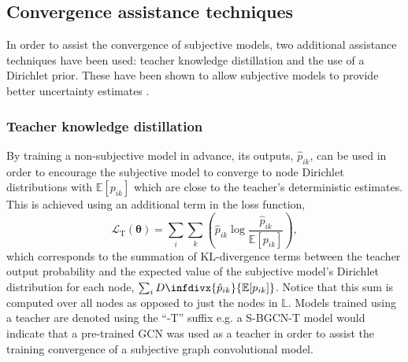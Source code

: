\documentclass[
twocolumn,
]{ceurart}
\newcommand{\infdiv}{D\infdivx}
\begin{document}
\subsection{Convergence assistance techniques}
In order to assist the convergence of subjective models, two additional assistance techniques have been used: teacher knowledge distillation and the use of a Dirichlet prior.
These have been shown to allow subjective models to provide better uncertainty estimates \cite{ZhaoXujiang2020}.
\subsubsection{Teacher knowledge distillation}
By training a non-subjective model in advance, its outputs, $\hat{p}_{ik}$, can be used in order to encourage the subjective model to converge to node Dirichlet distributions with $\mathbb{E}[p_{ik}]$ which are close to the teacher's deterministic estimates.
This is achieved using an additional term in the loss function,
\begin{equation}
    \mathcal{L}_{\text{T}}(\boldsymbol{\theta})=\sum_i\sum_k\left(\hat{p}_{ik}\log\frac{\hat{p}_{ik}}{\mathbb{E}[p_{ik}]}\right),
\end{equation}
which corresponds to the summation of KL-divergence terms between the teacher output probability and the expected value of the subjective model's Dirichlet distribution for each node, $\sum_i\infdiv{\hat{p}_{ik}}{\mathbb{E}[p_{ik}]}$.
Notice that this sum is computed over all nodes as opposed to just the nodes in $\mathbb{L}$.
Models trained using a teacher are denoted using the ``-T'' suffix e.g. a S-BGCN-T model would indicate that a pre-trained GCN was used as a teacher in order to assist the training convergence of a subjective graph convolutional model.
\end{document}
